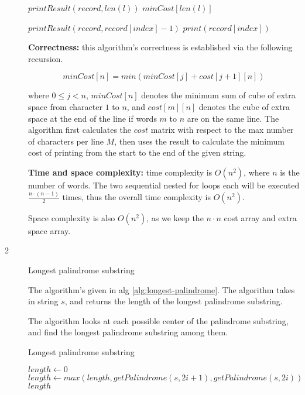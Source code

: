 \documentclass{article}
\begin{document}
\begin{description}
\begin{algorithm}[H]
\begin{algorithmic}[1]
      \State $printResult(record, len(l))$
      \State \Return $minCost[len(l)]$
    \EndFunction

        \State \Return {}
      \EndIf
      \State $printResult(record, record[index]-1)$
      \State $print(record[index])$
    \EndFunction

    \end{algorithmic}
  \end{algorithm}

  \textbf{Correctness:} this algorithm's correctness is established via the following recursion.

  $$ minCost[n] = min(minCost[j] + cost[j+1][n]) $$

  where $0 \leq j < n$, $minCost[n]$ denotes the minimum sum of cube of extra space from character $1$ to $n$, and $cost[m][n]$ denotes the cube of extra space at the end of the line if words $m$ to $n$ are on the same line. The algorithm first calculates the $cost$ matrix with respect to the max number of characters per line $M$, then uses the result to calculate the minimum cost of printing from the start to the end of the given string.

  \textbf{Time and space complexity:} time complexity is $O(n^2)$, where $n$ is the number of words. The two sequential nested for loops each will be executed $\frac{n \cdot (n-1)}{2}$ times, thus the overall time complexity is $O(n^2)$.

  Space complexity is also $O(n^2)$, as we keep the $n \cdot n$ cost array and extra space array.
  
\item[2]{Longest palindrome substring}

  The algorithm's given in alg \ref{alg:longest-palindrome}. The algorithm takes in string $s$, and returns the length of the longest palindrome substring.

  The algorithm looks at each possible center of the palindrome substring, and find the longest palindrome substring among them.

  \begin{algorithm}[H]
  \caption{Longest palindrome substring}
  \label{alg:longest-palindrome}
    \begin{algorithmic}[1]

      \State $length \gets 0$
        \State $length \gets max(length, getPalindrome(s, 2i + 1), getPalindrome(s, 2i))$
      \EndFor
      \State \Return $length$
    \EndFunction
    

\end{algorithmic}
\end{algorithm}
\end{description}
\end{document}
